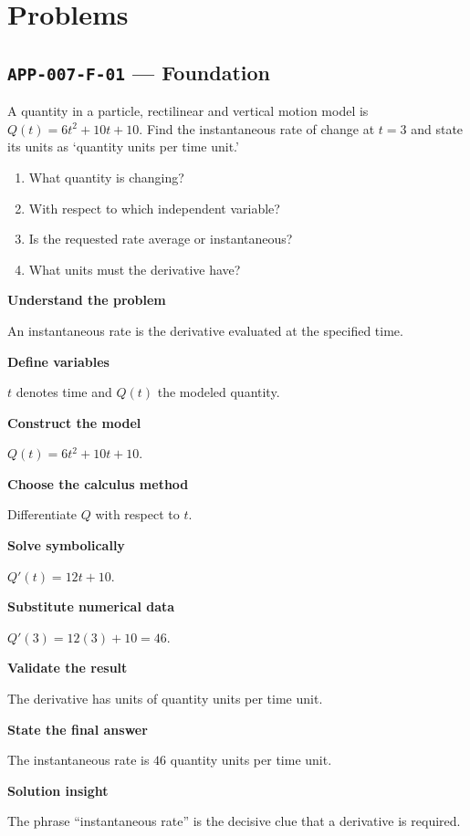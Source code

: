 \documentclass[11pt]{book}
\newcommand{\pid}[1]{\texttt{#1}}
\begin{document}
\section*{Problems}
\subsection*{\pid{APP-007-F-01} — Foundation}
\begin{problembox}
A quantity in a particle, rectilinear and vertical motion model is $Q(t)=6t^2+10t+10$. Find the instantaneous rate of change at $t=3$ and state its units as ‘quantity units per time unit.’
\end{problembox}
\begin{promptbox}\begin{enumerate}
\item What quantity is changing?
\item With respect to which independent variable?
\item Is the requested rate average or instantaneous?
\item What units must the derivative have?
\end{enumerate}\end{promptbox}
\begin{solutionbox}
\textbf{Understand the problem}\par An instantaneous rate is the derivative evaluated at the specified time.\par\medskip
\textbf{Define variables}\par $t$ denotes time and $Q(t)$ the modeled quantity.\par\medskip
\textbf{Construct the model}\par $Q(t)=6t^2+10t+10$.\par\medskip
\textbf{Choose the calculus method}\par Differentiate $Q$ with respect to $t$.\par\medskip
\textbf{Solve symbolically}\par $Q'(t)=12t+10$.\par\medskip
\textbf{Substitute numerical data}\par $Q'(3)=12(3)+10=46$.\par\medskip
\textbf{Validate the result}\par The derivative has units of quantity units per time unit.\par\medskip
\textbf{State the final answer}\par The instantaneous rate is $46$ quantity units per time unit.\par\medskip
\textbf{Solution insight}\par The phrase “instantaneous rate” is the decisive clue that a derivative is required.\par\medskip
\end{solutionbox}
\end{document}
